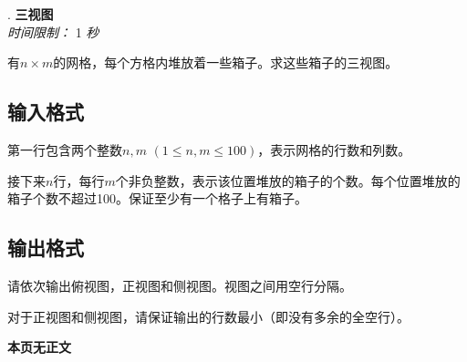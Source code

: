 \addtocounter{ProblemNo}{1}
\renewcommand{\ProblemName}{三视图}
\begin{center}
\huge{. \textbf{\ProblemName}} \\ [0.8cm]
\large{\textit{时间限制：} 1 \textit{秒}} \\ [1cm] 
\end{center}

有$n \times m$的网格，每个方格内堆放着一些箱子。求这些箱子的三视图。

\subsection*{输入格式}

第一行包含两个整数$n, m$ $(1 \leq n, m \leq 100)$，表示网格的行数和列数。

接下来$n$行，每行$m$个非负整数，表示该位置堆放的箱子的个数。每个位置堆放的箱子个数不超过100。保证至少有一个格子上有箱子。

\subsection*{输出格式}

请依次输出俯视图，正视图和侧视图。视图之间用空行分隔。

对于正视图和侧视图，请保证输出的行数最小（即没有多余的全空行）。

\setcounter{ExampleNo}{0}


\clearpage

\ifodd\value{page}
\else
    \vspace*{\fill}
    \begin{center}
    \textbf{\Large 本页无正文}
    \end{center}
    \vspace*{\fill}
    \clearpage
\fi

